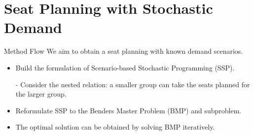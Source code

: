 
\section{Seat Planning with Stochastic Demand}
    \frame{\sectionpage}

    \begin{frame}{Method Flow}
      We aim to obtain a seat planning with known demand scenarios.
      \begin{itemize}
        \item Build the formulation of Scenario-based Stochastic Programming (SSP).
        \item[-] Consider the nested relation: a smaller group can take the seats planned for the larger group.
        \item Reformulate SSP to the Benders Master Problem (BMP) and subproblem.
        \item The optimal solution can be obtained by solving BMP iteratively. 
      \end{itemize}
    \end{frame}

